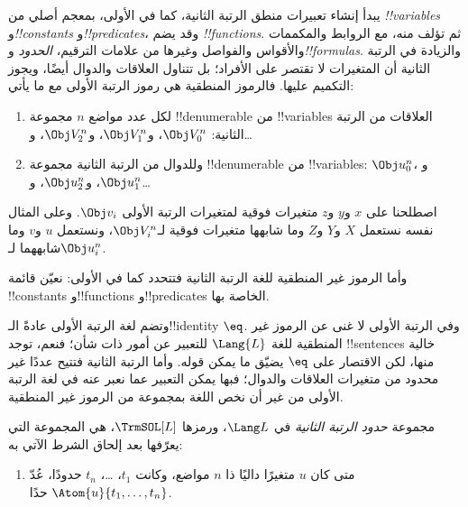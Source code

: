 \documentclass[../../../include/open-logic-section]{subfiles}
\begin{document}


يبدأ إنشاء تعبيرات منطق الرتبة الثانية، كما في الأولى، بمعجم
أصلي من \emph{!!{variable}s} و\emph{!!{constant}s}
و\emph{!!{predicate}s}، وقد يضم \emph{!!{function}s}.
ثم تؤلف منه، مع الروابط والمكممات والأقواس والفواصل وغيرها من
علامات الترقيم، \emph{الحدود} و\emph{!!{formula}s}.
والزيادة في الرتبة الثانية أن المتغيرات لا تقتصر على الأفراد؛
بل تتناول العلاقات والدوال أيضًا، ويجوز التكميم عليها.
فالرموز المنطقية هي رموز الرتبة الأولى مع ما يأتي:

\begin{enumerate}
\item لكل عدد مواضع $n$ مجموعة !!{denumerable} من
  !!{variable}s العلاقات من الرتبة الثانية:
  $\Obj V_0^n$، و$\Obj V_1^n$، و$\Obj V_2^n$، و\dots
\item وللدوال من الرتبة الثانية مجموعة !!{denumerable} من
  !!{variable}s: $\Obj u_0^n$، و$\Obj u_1^n$، و$\Obj u_2^n$، و\dots
\end{enumerate}

اصطلحنا على $x$ و$y$ و$z$ متغيرات فوقية لمتغيرات الرتبة
الأولى $\Obj v_i$. وعلى المثال نفسه نستعمل $X$ و$Y$ و$Z$
وما شابهها متغيرات فوقية لـ$\Obj V_i^n$، ونستعمل $u$ و$v$
وما شابههما لـ$\Obj u_i^n$.

\begin{explain}
وأما الرموز غير المنطقية للغة الرتبة الثانية فتتحدد كما في
الأولى: نعيّن قائمة !!{constant}s و!!{function}s
و!!{predicate}s الخاصة بها.

وتضم لغة الرتبة الأولى عادةً الـ!!{identity} $\eq$.
وفي الرتبة الأولى لا غنى عن الرموز غير المنطقية للغة $\Lang{L}$
للتعبير عن أمور ذات شأن؛ فنعم، توجد !!{sentence}s خالية
منها، لكن الاقتصار على $\eq$ يضيّق ما يمكن قوله.
وأما الرتبة الثانية فتتيح عددًا غير محدود من متغيرات العلاقات
والدوال؛ فبها يمكن التعبير عما نعبر عنه في لغة الرتبة الأولى
من غير أن نخص اللغة بمجموعة من الرموز غير المنطقية.
\end{explain}

\begin{defn}
مجموعة \emph{حدود الرتبة الثانية} في $\Lang L$، ورمزها
$\TrmSOL[L]$، هي المجموعة التي يعرّفها
 بعد إلحاق الشرط الآتي به:
\begin{enumerate}
\item متى كان $u$ متغيرًا داليًا ذا $n$ مواضع،
وكانت $t_1$، \dots، $t_n$ حدودًا، عُدّ
$\Atom{u}{t_1, \ldots, t_n}$ حدًا.
\end{enumerate}
\end{defn}
\end{document}
